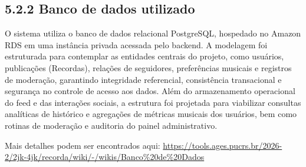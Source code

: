 \hypertarget{__RefHeading___Toc4835_3118176633}{}
\subsection*{5.2.2 Banco de dados utilizado}
\label{ages-iv:text-h-0109}

O sistema utiliza o banco de dados relacional PostgreSQL\space\cite{ages-iv-postgresql}, hospedado no Amazon RDS\space\cite{ages-iii-rds} em uma instância privada acessada pelo backend. A modelagem foi estruturada para contemplar as entidades centrais do projeto, como usuários, publicações (Recordas), relações de seguidores, preferências musicais e registros de moderação, garantindo integridade referencial, consistência transacional e segurança no controle de acesso aos dados. Além do armazenamento operacional do feed e das interações sociais, a estrutura foi projetada para viabilizar consultas analíticas de histórico e agregações de métricas musicais dos usuários, bem como rotinas de moderação e auditoria do painel administrativo.\par



Mais detalhes podem ser encontrados aqui: \url{https://tools.ages.pucrs.br/2026-2/2jk-4jk/recorda/wiki/-/wikis/Banco%20de%20Dados}\par
